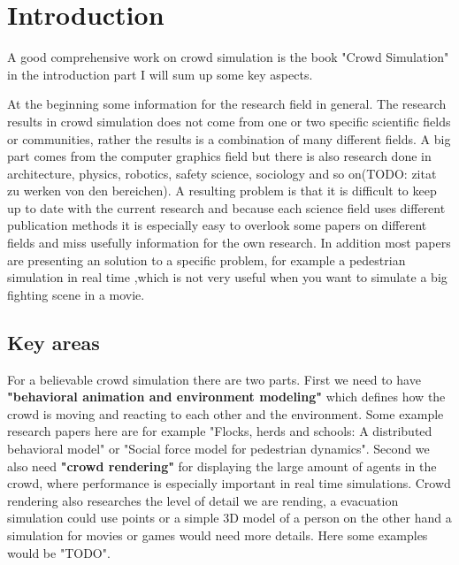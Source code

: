 \documentclass[sigconf]{acmart}
\begin{document}
\maketitle

\section{Introduction}

A good comprehensive work on crowd simulation is the book "Crowd Simulation" \cite{thalmann_crowd_2013} in the introduction part I will sum up some key aspects. 

At the beginning some information for the research field in general. The research results in crowd simulation does not come from one or two specific scientific fields or communities, rather the results is a combination of many different fields. A big part comes from the computer graphics field but there is also research done in architecture, physics, robotics, safety science, sociology and so on(TODO: zitat zu werken von den bereichen). A resulting problem is that it is difficult to keep up to date with the current research and because each science field uses different publication methods it is especially easy to overlook some papers on different fields and miss usefully information for the own research. In addition most papers are presenting an solution to a specific problem, for example a pedestrian simulation in real time \cite{karamouzas_predictive_2009},which is not very useful when you want to simulate a big fighting scene in a movie.


\subsection{Key areas}
\label{chap:key_areas}
For a believable crowd simulation there are two parts. First we need to have \textbf{"behavioral animation and environment modeling"}\cite{thalmann_crowd_2013} which defines how the crowd is moving and reacting to each other and the environment. Some example research papers here are for example "Flocks, herds and schools: A distributed behavioral model"\cite{reynolds_flocks_1987} or "Social force model for pedestrian dynamics"\cite{helbing_social_1995}. Second we also need \textbf{"crowd rendering"}\cite{thalmann_crowd_2013} for displaying the large amount of agents in the crowd, where performance is especially important in real time simulations. Crowd rendering also researches the level of detail we are rending, a evacuation simulation could use points or a simple 3D model of a person on the other hand a simulation for movies or games would need more details. Here some examples would be "TODO".
\end{document}
